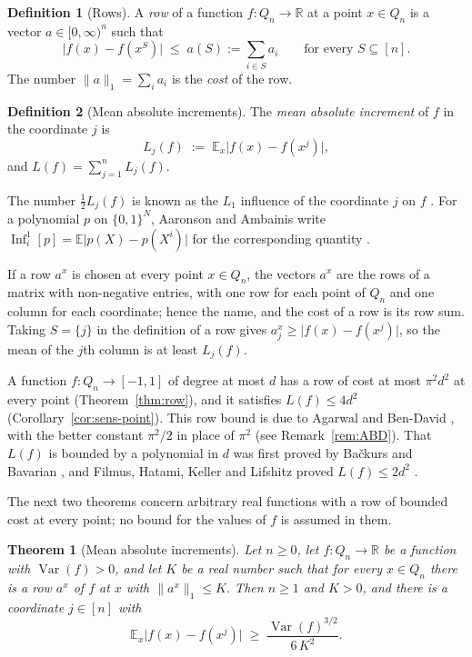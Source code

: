 \documentclass[11pt,reqno]{amsart}
\newtheorem{theorem}{Theorem}[section]
\theoremstyle{definition}
\newtheorem*{definition*}{Definition}
\theoremstyle{remark}
\numberwithin{equation}{section}
\theoremstyle{named}
\theoremstyle{plain}
\newcommand{\R}{\mathbb{R}}
\newcommand{\E}{\mathbb{E}}
\newcommand{\Var}{\operatorname{Var}}
\newcommand{\Inf}{\operatorname{Inf}}
\newcommand{\norm}[1]{\lVert #1\rVert_1}
\newcommand{\abs}[1]{\lvert #1\rvert}
\begin{document}
\begin{definition*}[Rows]
A \emph{row} of a function $f\colon Q_n\to\R$ at a
point $x\in Q_n$ is a vector $a\in[0,\infty)^{n}$ such that
\[
   \abs{f(x)-f(x^{S})}\;\le\;a(S):=\sum_{i\in S}a_i\qquad\text{for every }S\subseteq[n].
\]
The number $\norm{a}=\sum_ia_i$ is the \emph{cost} of the row.
\end{definition*}

\begin{definition*}[Mean absolute increments]
The \emph{mean absolute increment}
of $f$ in the coordinate $j$ is
\[
   L_j(f)\;:=\;\E_x\abs{f(x)-f(x^{j})},
\]
and $L(f)=\sum_{j=1}^{n}L_j(f)$.
\end{definition*}

The number $\frac12L_j(f)$ is known as the $L_1$ influence of the
coordinate $j$ on $f$ \cite{BB,FHKL}. For a polynomial $p$ on $\{0,1\}^{N}$, Aaronson and Ambainis
write $\Inf^{1}_i[p]=\E\abs{p(X)-p(X^{i})}$ for the corresponding quantity
\cite[Section~1.3]{AA14}.

If a row $a^{x}$ is chosen at every point $x\in Q_n$, the vectors $a^{x}$ are the rows of a matrix
with non-negative entries, with one row for each point of $Q_n$ and one column for each coordinate;
hence the name, and the cost of a row is its row sum. Taking $S=\{j\}$ in the definition of a row
gives $a^{x}_j\ge\abs{f(x)-f(x^{j})}$, so the mean of the $j$th column is at least $L_j(f)$.

A function $f\colon Q_n\to[-1,1]$ of degree at most $d$ has a row of cost at most $\pi^{2}d^{2}$
at every point (Theorem~\ref{thm:row}), and it satisfies $L(f)\le4d^{2}$
(Corollary~\ref{cor:sens-point}). This row bound is due to Agarwal and Ben-David
\cite[Theorem~1.7]{ABD}, with the better constant $\pi^{2}/2$ in place of $\pi^{2}$
(see Remark~\ref{rem:ABD}). That $L(f)$ is
bounded by a polynomial in $d$ was first proved by Ba\v{c}kurs and Bavarian \cite{BB}, and Filmus,
Hatami, Keller and Lifshitz proved $L(f)\le2d^{2}$ \cite[Theorem~3.3]{FHKL}.

The next two theorems concern arbitrary real functions with a
row of bounded cost at every point; no bound for the values of $f$ is assumed in them.

\begin{theorem}[Mean absolute increments]\label{thm:incr-intro}
Let $n\ge0$, let $f\colon Q_n\to\R$ be a function with $\Var(f)>0$, and let $K$ be a real number
such that for every $x\in Q_n$ there is a row $a^{x}$ of $f$ at $x$ with $\norm{a^{x}}\le K$. Then
$n\ge1$ and $K>0$, and there is a coordinate $j\in[n]$ with
\[
   \E_x\abs{f(x)-f(x^{j})}\;\ge\;\frac{\Var(f)^{3/2}}{6\,K^{2}} .
\]
\end{theorem}
\end{document}
